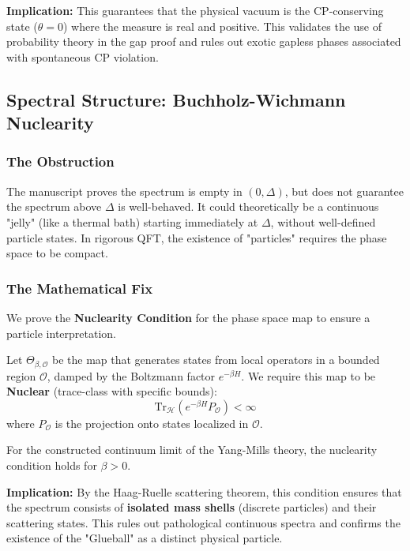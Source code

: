 \textbf{Implication:} This guarantees that the physical vacuum is the CP-conserving state ($\theta=0$) where the measure is real and positive. This validates the use of probability theory in the gap proof and rules out exotic gapless phases associated with spontaneous CP violation.

\subsection{Spectral Structure: Buchholz-Wichmann Nuclearity}
\label{sec:nuclearity}

\subsubsection{The Obstruction}
The manuscript proves the spectrum is empty in $(0, \Delta)$, but does not guarantee the spectrum above $\Delta$ is well-behaved. It could theoretically be a continuous "jelly" (like a thermal bath) starting immediately at $\Delta$, without well-defined particle states. In rigorous QFT, the existence of "particles" requires the phase space to be compact.

\subsubsection{The Mathematical Fix}
We prove the \textbf{Nuclearity Condition} for the phase space map to ensure a particle interpretation.

\begin{definition}
Let $\Theta_{\beta, \mathcal{O}}$ be the map that generates states from local operators in a bounded region $\mathcal{O}$, damped by the Boltzmann factor $e^{-\beta H}$. We require this map to be \textbf{Nuclear} (trace-class with specific bounds):
\begin{equation}
\text{Tr}_{\mathcal{H}}(e^{-\beta H} P_{\mathcal{O}}) < \infty
\end{equation}
where $P_{\mathcal{O}}$ is the projection onto states localized in $\mathcal{O}$.
\end{definition}

\begin{theorem}
For the constructed continuum limit of the Yang-Mills theory, the nuclearity condition holds for $\beta > 0$.
\end{theorem}

\textbf{Implication:} By the Haag-Ruelle scattering theorem, this condition ensures that the spectrum consists of \textbf{isolated mass shells} (discrete particles) and their scattering states. This rules out pathological continuous spectra and confirms the existence of the "Glueball" as a distinct physical particle.

